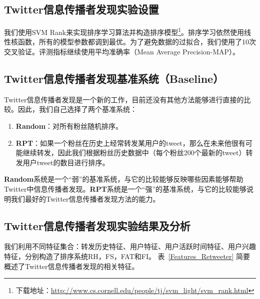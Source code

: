 \subsection{Twitter信息传播者发现实验设置}
我们使用SVM Rank来实现排序学习算法并构造排序模型\footnote{下载地址：\url{http://www.cs.cornell.edu/people/tj/svm_light/svm_rank.html}}。排序学习依然使用线性核函数，所有的模型参数都调到最优。为了避免数据的过拟合，我们使用了10次交叉验证。评测指标继续使用平均准确率（Mean Average Precision-MAP）。

\subsection{Twitter信息传播者发现基准系统（Baseline）}
Twitter信息传播者发现是一个新的工作，目前还没有其他方法能够进行直接的比较。因此，我们自己选择了两个基准系统：

\begin{enumerate}
\item{\textbf{Random}}：对所有粉丝随机排序。
\item{\textbf{RPT}}：如果一个粉丝在历史上经常转发某用户的tweet，那么在未来他很有可能继续转发，因此我们根据粉丝历史数据中（每个粉丝200个最新的tweet）转发用户tweet的数目进行排序。
\end{enumerate}

\textbf{Random}系统是一个“弱”的基准系统，与它的比较能够反映哪些因素能够帮助Twitter中信息传播者发现。\textbf{RPT}系统是一个“强”的基准系统，与它的比较能够说明我们最好的Twitter信息传播者发现方法的能力。

\subsection{Twitter信息传播者发现实验结果及分析}

我们利用不同特征集合：转发历史特征、用户特征、用户活跃时间特征、用户兴趣特征，分别构造了排序系统RH，FS，FAT和FI。 表~\ref{Features_Retweeter} 简要概述了Twitter信息传播者发现的相关特征。

